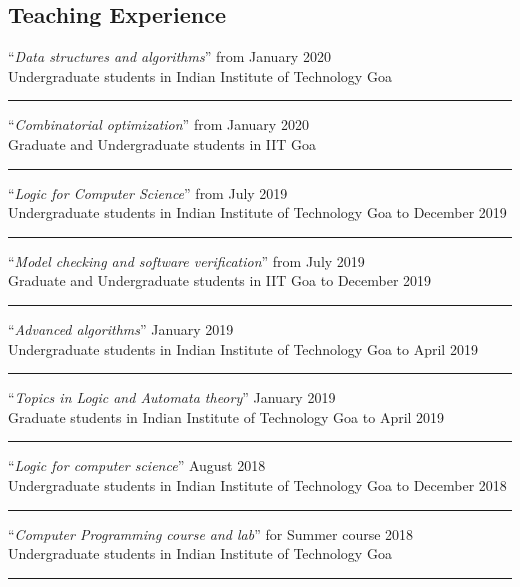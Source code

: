 \documentclass[margin]{res}
\begin{document}
\begin{resume}
\section{Teaching Experience}
					``\emph{Data structures and algorithms}'' \hfill from January 2020 \\
					Undergraduate students in Indian Institute of Technology Goa \\
					\noindent\rule{13cm}{0.4pt}
					``\emph{Combinatorial optimization}'' \hfill from January 2020 \\
					Graduate and Undergraduate students in IIT Goa \\
					\noindent \rule{13cm}{0.4pt}
					``\emph{Logic for Computer Science}'' \hfill from July 2019 \\
					Undergraduate students in Indian Institute of Technology Goa \hfill to December 2019  \\
					\noindent\rule{13cm}{0.4pt}
					``\emph{Model checking and software verification}'' \hfill from July 2019 \\
					Graduate and Undergraduate students in IIT Goa \hfill to December 2019   \\
					\noindent\rule{13cm}{0.4pt}
					``\emph{Advanced algorithms}'' \hfill January 2019 \\
					Undergraduate students in Indian Institute of Technology Goa \hfill to April 2019 \\
					\noindent\rule{13cm}{0.4pt}
					``\emph{Topics in Logic and Automata theory}'' \hfill January 2019 \\
					Graduate students in Indian Institute of Technology Goa \hfill to April 2019 \\
					\noindent\rule{13cm}{0.4pt}
					``\emph{Logic for computer science}'' \hfill August 2018 \\
					Undergraduate students in Indian Institute of Technology Goa \hfill to December 2018 \\
					\noindent\rule{13cm}{0.4pt}
					``\emph{Computer Programming course and lab}'' for  \hfill Summer course 2018 \\
					Undergraduate students in Indian Institute of Technology Goa \hfill  \\
					\noindent\rule{13cm}{0.4pt}					

\end{resume}
\end{document}
